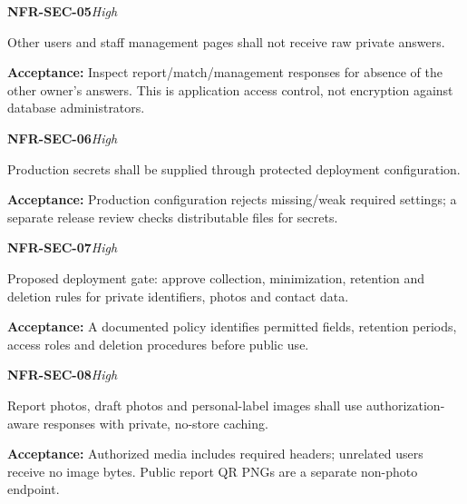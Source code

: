 \documentclass[12pt,a4paper,oneside]{report}
\begin{document}
\noindent\begin{minipage}{\linewidth}\textbf{NFR-SEC-05}\hfill\textit{High}\par\nopagebreak

Other users and staff management pages shall not receive raw private answers.

{\color{muted}\textbf{Acceptance:} Inspect report/match/management responses for absence of the other owner's answers. This is application access control, not encryption against database administrators.\par}\end{minipage}\par\vspace{5pt}

\noindent\begin{minipage}{\linewidth}\textbf{NFR-SEC-06}\hfill\textit{High}\par\nopagebreak

Production secrets shall be supplied through protected deployment configuration.

{\color{muted}\textbf{Acceptance:} Production configuration rejects missing/weak required settings; a separate release review checks distributable files for secrets.\par}\end{minipage}\par\vspace{5pt}

\noindent\begin{minipage}{\linewidth}\textbf{NFR-SEC-07}\hfill\textit{High}\par\nopagebreak

Proposed deployment gate: approve collection, minimization, retention and deletion rules for private identifiers, photos and contact data.

{\color{muted}\textbf{Acceptance:} A documented policy identifies permitted fields, retention periods, access roles and deletion procedures before public use.\par}\end{minipage}\par\vspace{5pt}

\noindent\begin{minipage}{\linewidth}\textbf{NFR-SEC-08}\hfill\textit{High}\par\nopagebreak

Report photos, draft photos and personal-label images shall use authorization-aware responses with private, no-store caching.

{\color{muted}\textbf{Acceptance:} Authorized media includes required headers; unrelated users receive no image bytes. Public report QR PNGs are a separate non-photo endpoint.\par}\end{minipage}\par\vspace{5pt}
\end{document}
